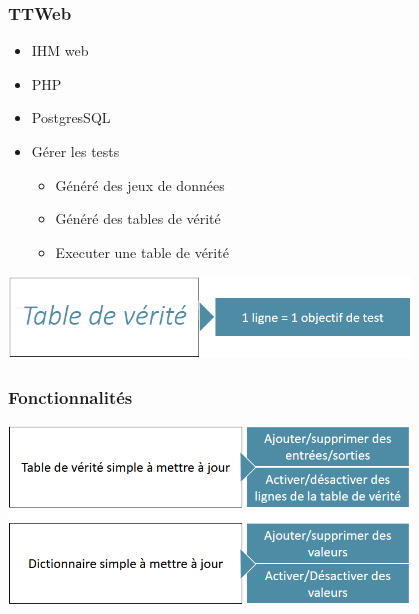 \begin{frame}
    \frametitle{TTWeb}
    \begin{itemize}
        \item IHM web
        \item PHP
        \item PostgresSQL
        \item Gérer les tests
            \begin{itemize}
                \item Généré des jeux de données
                \item Généré des tables de vérité
                \item Executer une table de vérité
            \end{itemize}
    \end{itemize}
    \begin{center}
        \includegraphics[width=0.8\textwidth]{./img/truth_table.png}
    \end{center}
\end{frame}

\begin{frame}
    \frametitle{Fonctionnalités}
    \begin{center}
        \includegraphics[width=0.8\textwidth]{./img/ttweb.png}
    \end{center}
\end{frame}